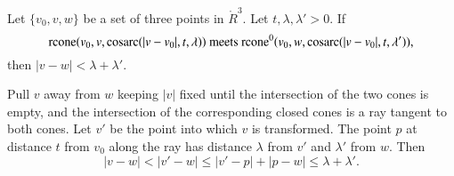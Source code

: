 \begin{tarskidata}
\begin{tarski}
\begin{lemma}
Let $\{v_0,v,w\}$ be a set of three points in $\ring{R}^3$.  Let $t,\lambda,\lambda'>0$.  If 
$${\operatorname{rcone}}(v_0,v,\operatorname{cosarc}(|v-v_0|,t,\lambda)) \text{ meets }
{\operatorname{rcone}}^0(v_0,w,\operatorname{cosarc}(|v-v_0|,t,\lambda')),$$ then
$|v-w| < \lambda+\lambda'$.
\end{lemma}

\begin{proved} Pull $v$ away from $w$ keeping $|v|$ fixed
until the intersection of the two
cones is empty, and the intersection of the corresponding closed cones
is a ray tangent to both cones.  Let $v'$ be the point into which
$v$ is transformed.  The point $p$ at distance $t$ from $v_0$ along
the ray has distance $\lambda$ from $v'$ and $\lambda'$ from $w$.
Then
  $$
  |v-w| < |v'-w| \le |v'-p| + |p-w| \le \lambda + \lambda'.
  $$
\swallowed\end{proved}
\end{tarski}
\end{tarskidata}



\filetarskiaway